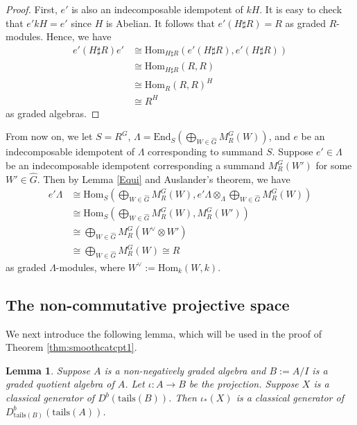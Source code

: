 \documentclass[11pt,reqno]{amsart}
\newtheorem{lemma}[theorem]{Lemma}
\theoremstyle{definition}
\begin{document}
{\begin{proof}
First, $e'$ is also an indecomposable idempotent of $kH$. 
It is easy to check that $e' kH = e'$ since $H$ is Abelian. 
It follows that $e'(H \sharp R) = R$ as graded $R$-modules. 
Hence, we have 
\begin{align*}
 e' (H \sharp R) e' & \cong \mathrm{Hom}_{H \sharp R}(e'(H \sharp R), e'(H \sharp R) ) \\
 & \cong \mathrm{Hom}_{H \sharp R}(R, R) \\
& \cong  \mathrm{Hom}_{R}(R, R)^{H} \\
& \cong R^{H}
\end{align*}
as graded algebras.
\end{proof}

From now on, we 
let $S = R^G$, $\Lambda = \mathrm{End}_{S}(\bigoplus\limits_{W \in \hat{G}} 
M_R^{G}(W))$, and $e$ be an indecomposable
idempotent of $\Lambda$ corresponding to summand $S$. 
Suppose $e' \in \Lambda$ be an indecomposable idempotent 
corresponding a summand $M_R^{G}(W')$ for some $W' \in \hat{G}$. 
Then by Lemma \ref{Equi} and Auslander's theorem,  
we have 
\begin{align}\label{245jdon}
e' \Lambda & \cong \mathrm{Hom}_{S}(\bigoplus\limits_{W \in \hat{G}} M_R^{G}(W), e' \Lambda \otimes_{\Lambda} \bigoplus\limits_{W \in \hat{G}} M_R^{G}(W))\nonumber\\ 
&\cong \mathrm{Hom}_{S}(\bigoplus\limits_{W \in \hat{G}} M_R^{G}(W), M_R^{G}(W')) \nonumber   \\ 
& \cong  \bigoplus\limits_{W \in \hat{G}} M_R^{G}(W^{\vee} \otimes W')\nonumber\\ 
&\cong  \bigoplus\limits_{W \in \hat{G}} M_R^{G}(W) \cong R
\end{align}
as graded $\Lambda$-modules, where
$W^\vee := \mathrm{Hom}_{k}(W, k)$. 

}

\fi


\subsection{The non-commutative projective space}\label{fgasrr}

We next introduce the following
lemma, which will be used 
in the proof of Theorem \ref{thm:smoothcatcpt1}.


\begin{lemma}\label{compgene}
Suppose 
$A$ is a non-negatively graded algebra and $B := A /I $ 
is a graded quotient algebra of $A$.
Let $\iota: A\to B$ be the projection. 
Suppose $X$ is a classical generator of $D^{b}(\mathrm{tails}(B))$.
Then $\iota_{\ast}(X)$ is a classical generator of 
$D_{\mathrm{tails}(B)}^{b}(\mathrm{tails}(A))$.
\end{lemma}
\end{document}
